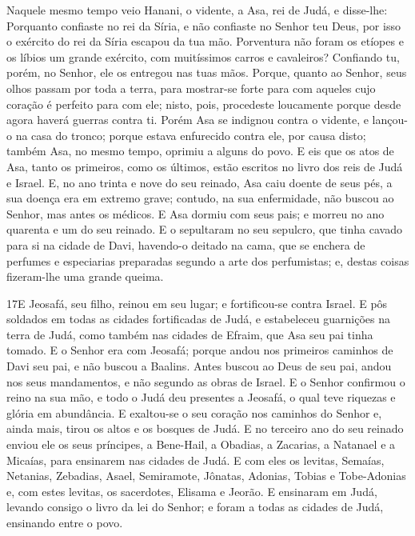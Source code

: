 Naquele mesmo tempo veio Hanani, o vidente, a Asa, rei de Judá, e
disse-lhe: Porquanto confiaste no rei da Síria, e não confiaste no
Senhor teu Deus, por isso o exército do rei da Síria escapou da tua
mão. Porventura não foram os etíopes e os líbios um grande
exército, com muitíssimos carros e cavaleiros? Confiando tu, porém,
no Senhor, ele os entregou nas tuas mãos. Porque, quanto ao
Senhor, seus olhos passam por toda a terra, para mostrar-se forte
para com aqueles cujo coração é perfeito para com ele; nisto, pois,
procedeste loucamente porque desde agora haverá guerras contra ti.
Porém Asa se indignou contra o vidente, e lançou-o na casa do
tronco; porque estava enfurecido contra ele, por causa disto; também
Asa, no mesmo tempo, oprimiu a alguns do povo. E eis que os
atos de Asa, tanto os primeiros, como os últimos, estão escritos no
livro dos reis de Judá e Israel. E, no ano trinta e nove do
seu reinado, Asa caiu doente de seus pés, a sua doença era em
extremo grave; contudo, na sua enfermidade, não buscou ao Senhor,
mas antes os médicos. E Asa dormiu com seus pais; e morreu no
ano quarenta e um do seu reinado. E o sepultaram no seu
sepulcro, que tinha cavado para si na cidade de Davi, havendo-o
deitado na cama, que se enchera de perfumes e especiarias preparadas
segundo a arte dos perfumistas; e, destas coisas fizeram-lhe uma
grande queima.

\medskip

\lettrine{17} E Jeosafá, seu filho, reinou em seu lugar; e
fortificou-se contra Israel. E pôs soldados em todas as cidades
fortificadas de Judá, e estabeleceu guarnições na terra de Judá,
como também nas cidades de Efraim, que Asa seu pai tinha tomado.
E o Senhor era com Jeosafá; porque andou nos primeiros caminhos
de Davi seu pai, e não buscou a Baalins. Antes buscou ao Deus de
seu pai, andou nos seus mandamentos, e não segundo as obras de
Israel. E o Senhor confirmou o reino na sua mão, e todo o Judá
deu presentes a Jeosafá, o qual teve riquezas e glória em
abundância. E exaltou-se o seu coração nos caminhos do Senhor e,
ainda mais, tirou os altos e os bosques de Judá. E no terceiro
ano do seu reinado enviou ele os seus príncipes, a Bene-Hail, a
Obadias, a Zacarias, a Natanael e a Micaías, para ensinarem nas
cidades de Judá. E com eles os levitas, Semaías, Netanias,
Zebadias, Asael, Semiramote, Jônatas, Adonias, Tobias e Tobe-Adonias
e, com estes levitas, os sacerdotes, Elisama e Jeorão. E
ensinaram em Judá, levando consigo o livro da lei do Senhor; e foram
a todas as cidades de Judá, ensinando entre o povo.

